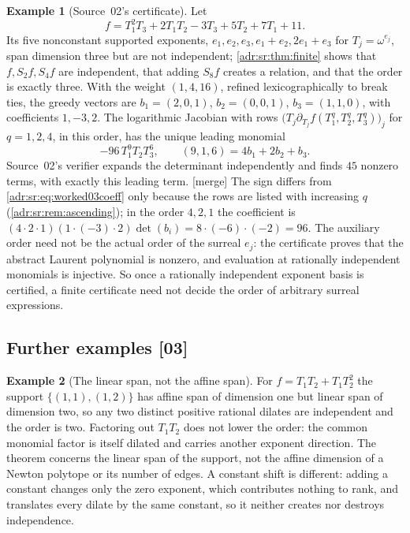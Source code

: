 \documentclass[11pt,letterpaper]{article}
\numberwithin{equation}{section}
\theoremstyle{definition}
\newtheorem{example}[example]{Example}
\theoremstyle{remark}
\newcommand{\mtag}{\textup{[merge]}}%
\newcommand{\src}[1]{\textup{[#1]}}%
\begin{document}
\begin{example}[Source~02's certificate]
\label{adr:sr:ex:rank-three-02}
Let
\begin{equation}\label{adr:sr:eq:worked02}
 f=T_1^2T_3+2T_1T_2-3T_3+5T_2+7T_1+11.
\end{equation}
Its five nonconstant supported exponents, $e_1,e_2,e_3,e_1+e_2,2e_1+e_3$ for
$T_j=\omega^{e_j}$, span dimension three but are not independent;
\cref{adr:sr:thm:finite} shows that $f,S_2f,S_4f$ are independent, that
adding $S_8f$ creates a relation, and that the order is exactly three. With
the weight $(1,4,16)$, refined lexicographically to break ties, the greedy
vectors are $b_1=(2,0,1)$, $b_2=(0,0,1)$, $b_3=(1,1,0)$, with coefficients
$1,-3,2$. The logarithmic Jacobian with rows
$\bigl(T_j\partial_{T_j}f(T_1^q,T_2^q,T_3^q)\bigr)_{j}$ for $q=1,2,4$, in this
order, has the unique leading monomial
\begin{equation}\label{adr:sr:eq:worked02lead}
 -96\,T_1^9T_2T_3^6,\qquad(9,1,6)=4b_1+2b_2+b_3.
\end{equation}
Source~02's verifier expands the determinant independently and finds $45$
nonzero terms, with exactly this leading term. \mtag{} The sign differs from
\eqref{adr:sr:eq:worked03coeff} only because the rows are listed with
increasing $q$ (\cref{adr:sr:rem:ascending}); in the order $4,2,1$ the
coefficient is $(4\cdot2\cdot1)(1\cdot(-3)\cdot2)\det(b_i)=8\cdot(-6)\cdot(-2)=96$.
The auxiliary order need not be the actual order of the surreal $e_j$: the
certificate proves that the abstract Laurent polynomial is nonzero, and
evaluation at rationally independent monomials is injective. So once a
rationally independent exponent basis is certified, a finite certificate
need not decide the order of arbitrary surreal expressions.
\end{example}

\subsection{Further examples \src{03}}

\begin{example}[The linear span, not the affine span]
For $f=T_1T_2+T_1T_2^2$ the support $\{(1,1),(1,2)\}$ has affine span of
dimension one but linear span of dimension two, so any two distinct positive
rational dilates are independent and the order is two. Factoring out $T_1T_2$
does not lower the order: the common monomial factor is itself dilated and
carries another exponent direction. The theorem concerns the linear span of
the support, not the affine dimension of a Newton polytope or its number of
edges. A constant shift is different: adding a constant changes only the zero
exponent, which contributes nothing to rank, and translates every dilate by
the same constant, so it neither creates nor destroys independence.
\end{example}
\end{document}
